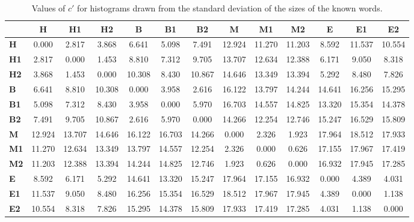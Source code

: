 \begin{table*}[h!]
\begin{center}
\begin{tabular}{| l || c | c | c || c | c | c || c | c | c || c | c | c |}\hline
 & {\bf H} & {\bf H1} & {\bf H2} & {\bf B} & {\bf B1} & {\bf B2} & {\bf M} & {\bf M1} & {\bf M2} & {\bf E} & {\bf E1} & {\bf E2} \\\hline\hline
{\bf H} & 0.000 & 2.817 & 3.868 & 6.641 & 5.098 & 7.491 & 12.924 & 11.270 & 11.203 & 8.592 & 11.537 & 10.554 \\\hline
{\bf H1} & 2.817 & 0.000 & 1.453 & 8.810 & 7.312 & 9.705 & 13.707 & 12.634 & 12.388 & 6.171 & 9.050 & 8.318 \\\hline
{\bf H2} & 3.868 & 1.453 & 0.000 & 10.308 & 8.430 & 10.867 & 14.646 & 13.349 & 13.394 & 5.292 & 8.480 & 7.826 \\\hline\hline
{\bf B} & 6.641 & 8.810 & 10.308 & 0.000 & 3.958 & 2.616 & 16.122 & 13.797 & 14.244 & 14.641 & 16.256 & 15.295 \\\hline
{\bf B1} & 5.098 & 7.312 & 8.430 & 3.958 & 0.000 & 5.970 & 16.703 & 14.557 & 14.825 & 13.320 & 15.354 & 14.378 \\\hline
{\bf B2} & 7.491 & 9.705 & 10.867 & 2.616 & 5.970 & 0.000 & 14.266 & 12.254 & 12.746 & 15.247 & 16.529 & 15.809 \\\hline\hline
{\bf M} & 12.924 & 13.707 & 14.646 & 16.122 & 16.703 & 14.266 & 0.000 & 2.326 & 1.923 & 17.964 & 18.512 & 17.933 \\\hline
{\bf M1} & 11.270 & 12.634 & 13.349 & 13.797 & 14.557 & 12.254 & 2.326 & 0.000 & 0.626 & 17.155 & 17.967 & 17.419 \\\hline
{\bf M2} & 11.203 & 12.388 & 13.394 & 14.244 & 14.825 & 12.746 & 1.923 & 0.626 & 0.000 & 16.932 & 17.945 & 17.285 \\\hline\hline
{\bf E} & 8.592 & 6.171 & 5.292 & 14.641 & 13.320 & 15.247 & 17.964 & 17.155 & 16.932 & 0.000 & 4.389 & 4.031 \\\hline
{\bf E1} & 11.537 & 9.050 & 8.480 & 16.256 & 15.354 & 16.529 & 18.512 & 17.967 & 17.945 & 4.389 & 0.000 & 1.138 \\\hline
{\bf E2} & 10.554 & 8.318 & 7.826 & 15.295 & 14.378 & 15.809 & 17.933 & 17.419 & 17.285 & 4.031 & 1.138 & 0.000 \\\hline
\end{tabular}
\caption{Values of $c'$ for histograms drawn from the standard deviation of the sizes of the known words.}
\end{center}
\end{table*}